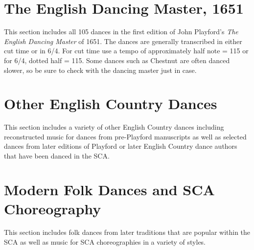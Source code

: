 \documentclass[11pt]{book}
\begin{document}

\chapter{The English Dancing Master, 1651}

This section includes all 105 dances in the first edition of John Playford's
{\em The English Dancing Master} of 1651.  The dances are generally transcribed
in either cut time or in 6/4. For cut time use a tempo of approximately half
note = 115 or for 6/4, dotted half = 115.  Some dances such as Chestnut are
often danced slower, so be sure to check with the dancing master just in case.

\clearpage


\chapter{Other English Country Dances}

This section includes a variety of other English Country dances including
reconstructed music for dances from pre-Playford manuscripts as well as
selected dances from later editions of Playford or later English Country dance
authors that have been danced in the SCA.

\clearpage


\chapter{Modern Folk Dances and SCA Choreography}

This section includes folk dances from later traditions that are popular within
the SCA as well as music for SCA choreographies in a variety of styles.

\clearpage


\clearpage

\printindex
\end{document}
